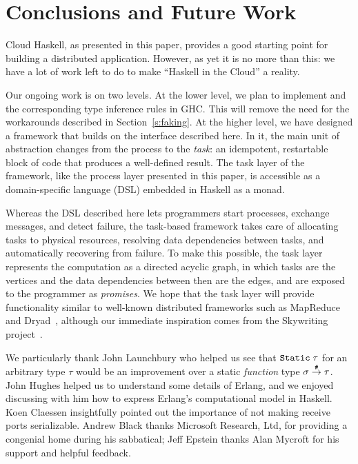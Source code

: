 \documentclass[preprint]{sigplanconf}
\begin{document}
\section{Conclusions and Future Work}
\label{s:futureWork}
Cloud Haskell, as presented in this paper, provides a good starting point for building a distributed application.  
However, as yet it is no more than this: we have a lot of work left to do to make ``Haskell in the Cloud'' a reality.

Our ongoing work is on two levels.
At the lower level, we plan to implement  and the corresponding type inference rules in GHC.  This will remove the need for the workarounds described in Section~\ref{s:faking}.
At the higher level, we have designed a framework that builds on the interface described here.
In it, the main unit of abstraction changes from the process to the \emph{task}: an idempotent, restartable block of code that produces a well-defined result. The task layer of the framework, like the process layer presented in this paper, is accessible as a domain-specific language (DSL) embedded in Haskell as a monad.

Whereas the DSL described here lets programmers start processes, exchange messages, and detect failure, the task-based framework takes care of allocating tasks to physical resources, resolving data dependencies between tasks, and automatically recovering from failure. 
To make this possible, the task layer represents the computation as a directed acyclic graph, in which tasks are the vertices and the data dependencies between then are the edges, and are exposed to the programmer as \emph{promises}.
We hope that the task layer will provide functionality similar to well-known distributed frameworks such as MapReduce~\cite{MapReduce2008} and Dryad~\cite{Dryad2007}, although our immediate inspiration comes from the Skywriting project~\cite{Murray2010,Murray2011}.

\acks
We particularly thank John Launchbury who helped us see that $\text{\tt Static}\;\tau$ for an arbitrary type $\tau$
would be an improvement over a static \emph{function} type 
$\sigma \stackrel{\texttt{\#}}{\rightarrow} \tau$.  John Hughes helped us to understand some details of Erlang, and we enjoyed discussing with him how to express Erlang's computational model in Haskell. Koen Claessen
insightfully pointed out the importance of not making receive ports serializable.
Andrew Black thanks Microsoft Research, Ltd, for providing a congenial home during his sabbatical;
Jeff Epstein thanks Alan Mycroft for his support and helpful feedback. 





%
%
%
\end{document}
